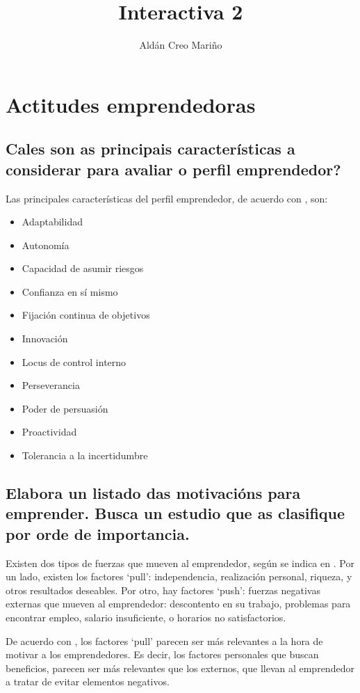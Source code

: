 \documentclass[a4paper]{article}
\title{Interactiva 2}
\author{Aldán Creo Mariño}
\begin{document}
\maketitle

\section{Actitudes emprendedoras}
\subsection{Cales son as principais características a considerar para avaliar o perfil emprendedor?}

Las principales características del perfil emprendedor, de acuerdo con \cite{RefWorks:doc:602fadc2c9e77c0001379bac}, son:

\begin{itemize}
    \item Adaptabilidad
    \item Autonomía
    \item Capacidad de asumir riesgos
    \item Confianza en sí mismo
    \item Fijación continua de objetivos
    \item Innovación
    \item Locus de control interno
    \item Perseverancia
    \item Poder de persuasión
    \item Proactividad
    \item Tolerancia a la incertidumbre
\end{itemize}

\subsection{Elabora un listado das motivacións para emprender. Busca un estudio que as clasifique por orde de importancia.}

Existen dos tipos de fuerzas que mueven al emprendedor, según se indica en \cite{RefWorks:doc:602fa427c9e77c0001379ab3}. Por un lado, existen los factores `pull': independencia, realización personal, riqueza, y otros resultados deseables. Por otro, hay factores `push': fuerzas negativas externas que mueven al emprendedor: descontento en su trabajo, problemas para encontrar empleo, salario insuficiente, o horarios no satisfactorios.

De acuerdo con \cite{RefWorks:doc:602fab10c9e77c0001379b54}, los factores `pull' parecen ser más relevantes a la hora de motivar a los emprendedores. Es decir, los factores personales que buscan beneficios, parecen ser más relevantes que los externos, que llevan al emprendedor a tratar de evitar elementos negativos.
\end{document}
